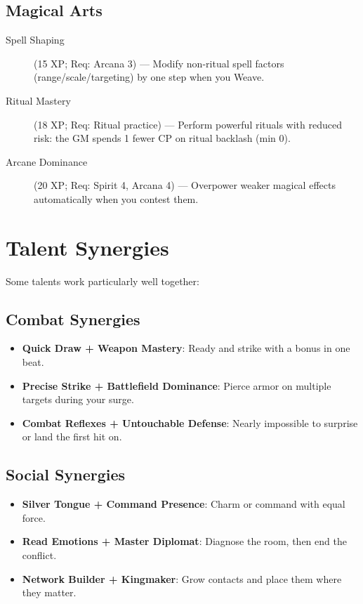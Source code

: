 \begin{multicols}{2}
\subsection*{Magical Arts}
\begin{description}
\item[Spell Shaping] (15 XP; Req: Arcana 3) --- Modify non-ritual spell factors (range/scale/targeting) by one step when you Weave.
\item[Ritual Mastery] (18 XP; Req: Ritual practice) --- Perform powerful rituals with reduced risk: the GM spends 1 fewer CP on ritual backlash (min 0).
\item[Arcane Dominance] (20 XP; Req: Spirit 4, Arcana 4) --- Overpower weaker magical effects automatically when you contest them.
\end{description}

\section{Talent Synergies}

Some talents work particularly well together:

\subsection*{Combat Synergies}
\begin{itemize}
\item \textbf{Quick Draw + Weapon Mastery}: Ready and strike with a bonus in one beat.
\item \textbf{Precise Strike + Battlefield Dominance}: Pierce armor on multiple targets during your surge.
\item \textbf{Combat Reflexes + Untouchable Defense}: Nearly impossible to surprise or land the first hit on.
\end{itemize}

\subsection*{Social Synergies}
\begin{itemize}
\item \textbf{Silver Tongue + Command Presence}: Charm or command with equal force.
\item \textbf{Read Emotions + Master Diplomat}: Diagnose the room, then end the conflict.
\item \textbf{Network Builder + Kingmaker}: Grow contacts and place them where they matter.
\end{itemize}


\end{multicols}
